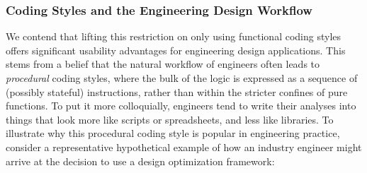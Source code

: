 \subsubsection{Coding Styles and the Engineering Design Workflow}

We contend that lifting this restriction on only using functional coding styles offers significant usability advantages for engineering design applications. This stems from a belief that the natural workflow of engineers often leads to \emph{procedural} coding styles, where the bulk of the logic is expressed as a sequence of (possibly stateful) instructions, rather than within the stricter confines of pure functions. To put it more colloquially, engineers tend to write their analyses into things that look more like scripts or spreadsheets, and less like libraries. To illustrate why this procedural coding style is popular in engineering practice, consider a representative hypothetical example of how an industry engineer might arrive at the decision to use a design optimization framework:

